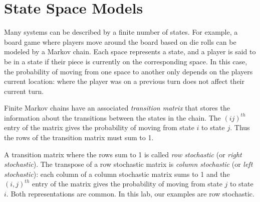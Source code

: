 \label{lab:Markov}

\section*{State Space Models} %

Many systems can be described by a finite number of states.
For example, a board game where players move around the board based on die rolls can be modeled by a Markov chain.
Each space represents a state, and a player is said to be in a state if their piece is currently on the corresponding space.
In this case, the probability of moving from one space to another only depends on the players current location: where the player was on a previous turn does not affect their current turn.

Finite Markov chains have an associated \emph{transition matrix} that stores the information about the transitions between the states in the chain.
The $(ij)^{th}$ entry of the matrix gives the probability of moving from state $i$ to state $j$.
Thus the rows of the transition matrix must sum to 1.

\begin{info} %
A transition matrix where the rows sum to 1 is called \emph{row stochastic} (or \emph{right stochastic}).
The transpose of a row stochastic matrix is \emph{column stochastic} (or \emph{left stochastic}): each column of a column stochastic matrix sums to 1 and the $(i,j)^{th}$ entry of the matrix gives the probability of moving from state $j$ to state $i$.
Both representations are common. In this lab, our examples are row stochastic.
\end{info}

